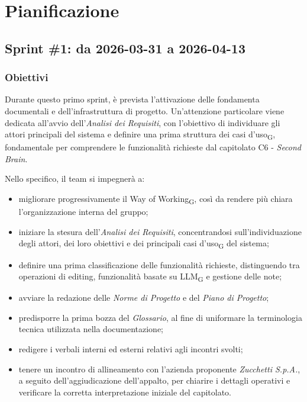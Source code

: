 ﻿\documentclass[a4paper, 10pt, colorlinks=true, linkcolor=black, urlcolor=blue, citecolor=blue, hidelinks]{article}
\begin{document}
\section{Pianificazione}

\subsection{Sprint \#1: da 2026-03-31 a 2026-04-13}
\subsubsection{Obiettivi}
Durante questo primo sprint, è prevista l'attivazione delle fondamenta documentali e dell'infrastruttura di progetto. Un'attenzione particolare viene dedicata all'avvio dell'\textit{Analisi dei Requisiti}, con l'obiettivo di individuare gli attori principali del sistema e definire una prima struttura dei casi d'uso\textsubscript{G}, fondamentale per comprendere le funzionalità richieste dal capitolato C6 - \textit{Second Brain}.

Nello specifico, il team si impegnerà a:
\begin{itemize}
    \item migliorare progressivamente il Way of Working\textsubscript{G}, così da rendere più chiara l'organizzazione interna del gruppo;
    \item iniziare la stesura dell'\textit{Analisi dei Requisiti}, concentrandosi sull'individuazione degli attori, dei loro obiettivi e dei principali casi d'uso\textsubscript{G} del sistema;
    \item definire una prima classificazione delle funzionalità richieste, distinguendo tra operazioni di editing, funzionalità basate su LLM\textsubscript{G} e gestione delle note;
    \item avviare la redazione delle \textit{Norme di Progetto} e del \textit{Piano di Progetto};
    \item predisporre la prima bozza del \textit{Glossario}, al fine di uniformare la terminologia tecnica utilizzata nella documentazione;
    \item redigere i verbali interni ed esterni relativi agli incontri svolti;
    \item tenere un incontro di allineamento con l'azienda proponente \textit{Zucchetti S.p.A.}, a seguito dell'aggiudicazione dell'appalto, per chiarire i dettagli operativi e verificare la corretta interpretazione iniziale del capitolato.
\end{itemize}
\end{document}
